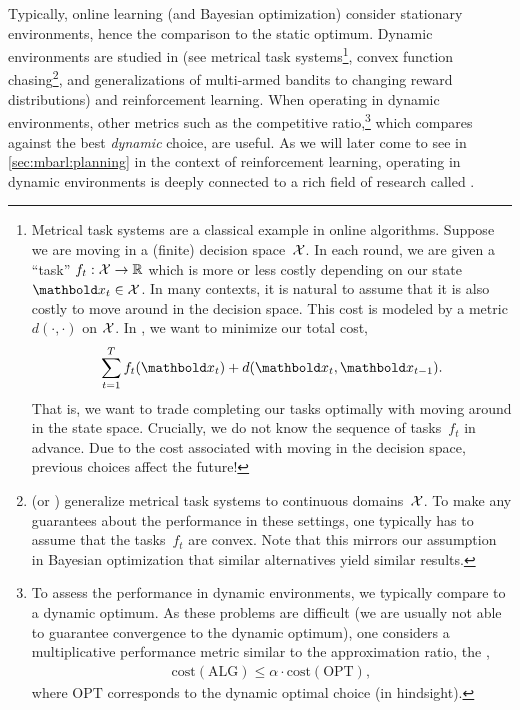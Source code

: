 Typically, online learning (and Bayesian optimization) consider stationary environments, hence the comparison to the static optimum.
Dynamic environments are studied in  (see metrical task systems\footnote[][-16\baselineskip]{Metrical task systems are a classical example in online algorithms. Suppose we are moving in a (finite) decision space~$\mathcal{X}$. In each round, we are given a ``task'' $f_t : \mathcal{X} \to \mathbb{R}$ which is more or less costly depending on our state~${\vx_t \in \spX}$. In many contexts, it is natural to assume that it is also costly to move around in the decision space. This cost is modeled by a metric $d(\cdot, \cdot)$ on $\mathcal{X}$. In , we want to minimize our total cost, \begin{align*}
  \sum_{t=1}^T f_t(\vx_t) + d(\vx_t, \vx_{t-1}).
\end{align*} That is, we want to trade completing our tasks optimally with moving around in the state space. Crucially, we do not know the sequence of tasks~$f_t$ in advance. Due to the cost associated with moving in the decision space, previous choices affect the future!}, convex function chasing\footnote{ (or ) generalize metrical task systems to continuous domains~$\mathcal{X}$. To make any guarantees about the performance in these settings, one typically has to assume that the tasks~$f_t$ are convex. Note that this mirrors our assumption in Bayesian optimization that similar alternatives yield similar results.}, and generalizations of multi-armed bandits to changing reward distributions) and reinforcement learning.
When operating in dynamic environments, other metrics such as the competitive ratio,\footnote{To assess the performance in dynamic environments, we typically compare to a dynamic optimum. As these problems are difficult (we are usually not able to guarantee convergence to the dynamic optimum), one considers a multiplicative performance metric similar to the approximation ratio, the , \begin{align*}
  \mathrm{cost}(\mathrm{ALG}) \leq \alpha \cdot \mathrm{cost}(\mathrm{OPT}),
\end{align*} where $\mathrm{OPT}$ corresponds to the dynamic optimal choice (in hindsight).} which compares against the best \emph{dynamic} choice, are useful.
As we will later come to see in \cref{sec:mbarl:planning} in the context of reinforcement learning, operating in dynamic environments is deeply connected to a rich field of research called .

